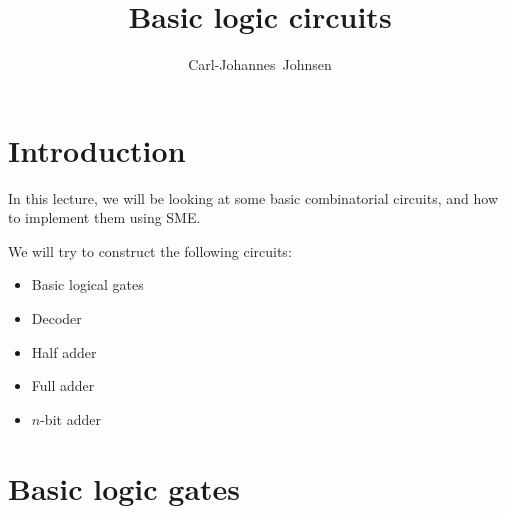 \documentclass{beamer}
\title{Basic logic circuits}
\author[Carl-Johannes Johnsen]{
  \mbox{Carl-Johannes Johnsen}}
\institute{Department of Computer Science\\
           University of Copenhagen}
\begin{document}
\frame{\titlepage}


\section{Introduction}
\begin{frame}
    In this lecture, we will be looking at some basic combinatorial circuits,
    and how to implement them using SME.

    \vspace{\baselineskip}
    We will try to construct the following circuits:
    \begin{itemize}
        \item Basic logical gates
        \item Decoder
        \item Half adder
        \item Full adder
        \item $n$-bit adder
    \end{itemize}
\end{frame}

\section{Basic logic gates}
\end{document}
